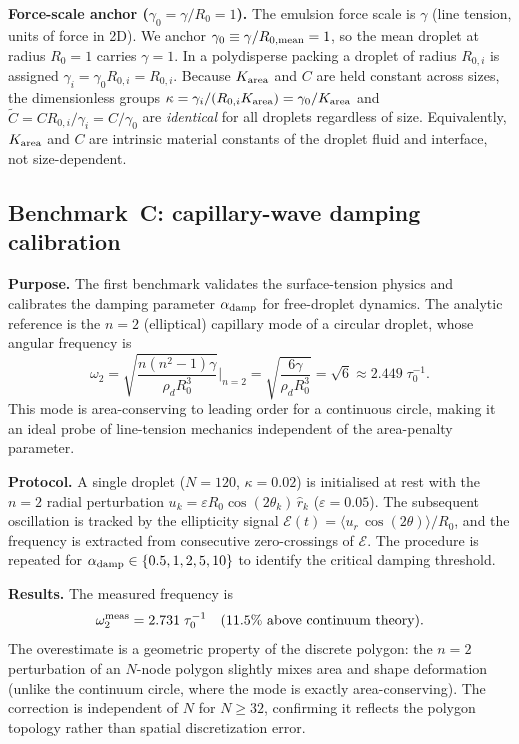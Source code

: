 \documentclass[aps,pre,twocolumn,floatfix,longbibliography]{revtex4-2}
\begin{document}
\textbf{Force-scale anchor ($\gamma_0 = \gamma/R_0 = 1$).}
The emulsion force scale is $\gamma$ (line tension, units of force in 2D).  We
anchor $\gamma_0 \equiv \gamma/R_{0,\rm mean} = 1$, so the mean droplet at radius
$R_0 = 1$ carries $\gamma = 1$.  In a polydisperse packing a droplet of radius
$R_{0,i}$ is assigned $\gamma_i = \gamma_0 R_{0,i} = R_{0,i}$.  Because
$K_{\rm area}$ and $C$ are held constant across sizes, the dimensionless groups
$\kappa = \gamma_i/(R_{0,i} K_{\rm area}) = \gamma_0/K_{\rm area}$ and
$\tilde{C} = C R_{0,i}/\gamma_i = C/\gamma_0$ are \emph{identical} for all
droplets regardless of size.  Equivalently, $K_{\rm area}$ and $C$ are intrinsic
material constants of the droplet fluid and interface, not size-dependent.

\subsection{Benchmark~C: capillary-wave damping calibration}
\label{sec:emulsion_benchmarks_C}

\textbf{Purpose.}  The first benchmark validates the surface-tension physics and
calibrates the damping parameter $\alpha_{\rm damp}$ for free-droplet dynamics.  The
analytic reference is the $n = 2$ (elliptical) capillary mode of a circular droplet,
whose angular frequency is~\cite{Lamb1932}
\begin{equation}
  \omega_2 = \sqrt{\frac{n(n^2-1)\gamma}{\rho_d R_0^3}}\bigg|_{n=2}
           = \sqrt{\frac{6\gamma}{\rho_d R_0^3}}
           = \sqrt{6} \approx 2.449\;\tau_0^{-1}.
  \label{eq:omega2}
\end{equation}
This mode is area-conserving to leading order for a continuous circle, making it an
ideal probe of line-tension mechanics independent of the area-penalty parameter.

\textbf{Protocol.}  A single droplet ($N = 120$, $\kappa = 0.02$) is initialised
at rest with the $n = 2$ radial perturbation
$u_k = \varepsilon R_0 \cos(2\theta_k)\,\hat{r}_k$ ($\varepsilon = 0.05$).  The
subsequent oscillation is tracked by the ellipticity signal
$\mathcal{E}(t) = \langle u_r\,\cos(2\theta)\rangle/R_0$, and the frequency is
extracted from consecutive zero-crossings of $\mathcal{E}$.  The procedure is
repeated for $\alpha_{\rm damp} \in \{0.5, 1, 2, 5, 10\}$ to identify the critical
damping threshold.

\textbf{Results.}  The measured frequency is
\begin{equation}
  \omega_2^{\rm meas} = 2.731\;\tau_0^{-1} \quad
  (11.5\%\ \text{above continuum theory}).
\end{equation}
The overestimate is a geometric property of the discrete polygon: the $n=2$
perturbation of an $N$-node polygon slightly mixes area and shape deformation
(unlike the continuum circle, where the mode is exactly area-conserving).  The
correction is independent of $N$ for $N \geq 32$, confirming it reflects the
polygon topology rather than spatial discretization error.
\end{document}

